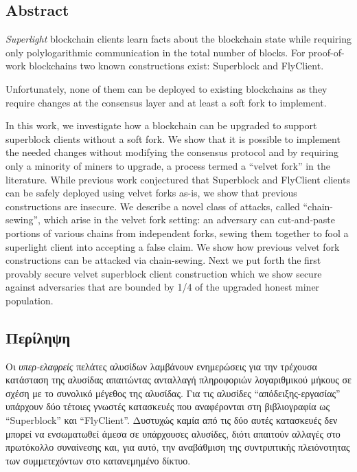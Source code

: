 \begin{center}
    \section*{Abstract}
\end{center}
{\em Superlight} blockchain clients
learn facts about the blockchain state
while requiring only polylogarithmic communication in the total
number of blocks.
For proof-of-work blockchains
two known constructions exist: Superblock and FlyClient.

Unfortunately, none of them can be deployed to existing blockchains as they require changes at the consensus layer and at least a soft fork to implement.

In this work, we
investigate how a blockchain can be upgraded to support superblock clients without a soft fork. We show that it is possible to implement the needed changes without modifying the consensus protocol and by requiring only a minority of miners to upgrade, a process termed a ``velvet fork'' in the literature. While previous work conjectured that Superblock and FlyClient clients can be safely deployed using velvet forks as-is, we show that previous constructions are insecure. We describe a novel class of attacks, called  ``chain-sewing'', which arise in the velvet fork setting: an adversary can cut-and-paste portions of various chains from independent forks, sewing them together to
fool a superlight client into accepting a false claim.
We show how previous velvet fork constructions can be attacked via chain-sewing.
Next we put forth the first provably secure velvet superblock client construction which we show  secure against adversaries that are bounded by 1/4 of the upgraded honest miner population.

\newpage
\begin{center}
    \section*{Περίληψη}
\end{center}
Οι \emph{υπερ-ελαφρείς} πελάτες αλυσίδων λαμβάνουν ενημερώσεις για την τρέχουσα κατάσταση της αλυσίδας απαιτώντας ανταλλαγή πληροφοριών λογαριθμικού μήκους σε σχέση με το συνολικό μέγεθος της αλυσίδας. Για τις αλυσίδες ``απόδειξης-εργασίας'' υπάρχουν δύο τέτοιες γνωστές κατασκευές που αναφέρονται στη βιβλιογραφία ως ``Superblock'' και ``FlyClient''. Δυστυχώς καμία από τις δύο αυτές κατασκευές δεν μπορεί να ενσωματωθεί άμεσα σε υπάρχουσες αλυσίδες, διότι απαιτούν αλλαγές στο πρωτόκολλο συναίνεσης και, για αυτό, την αναβάθμιση της συντριπτικής πλειόνοτητας των συμμετεχόντων στο κατανεμημένο δίκτυο. 

